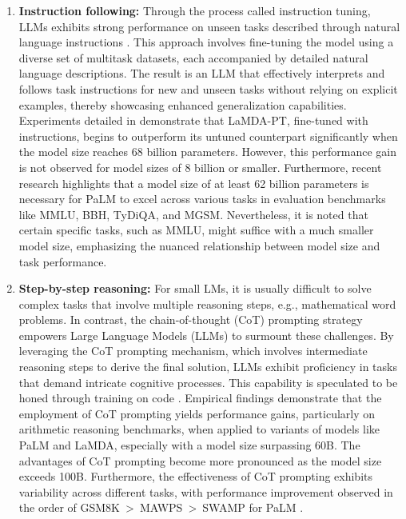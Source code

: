 \begin{enumerate}
{\begin{enumerate}
{\begin{quote}
                    \textit{Input:} {\enquote{What is the sum of 42 and 63?}} \\
                    \textit{Output:} {\enquote{The sum of 42 and 63 is 105.}}
                \end{quote}
            }
            \item \textbf{Instruction following:}{
                Through the process called instruction tuning, LLMs exhibits strong performance on unseen tasks described through natural language instructions \cite{instruction1, ouyang2022training, wei2022fine}.
                This approach involves fine-tuning the model using a diverse set of multitask datasets, each accompanied by detailed natural language descriptions. The result is an LLM that effectively interprets and follows task instructions for new and unseen tasks without relying on explicit examples, thereby showcasing enhanced generalization capabilities.
                Experiments detailed in \cite{wei2022fine} demonstrate that LaMDA-PT, fine-tuned with instructions, begins to outperform its untuned counterpart significantly when the model size reaches 68 billion parameters. However, this performance gain is not observed for model sizes of 8 billion or smaller. Furthermore, recent research \cite{chung2022scaling} highlights that a model size of at least 62 billion parameters is necessary for PaLM to excel across various tasks in evaluation benchmarks like MMLU, BBH, TyDiQA, and MGSM. Nevertheless, it is noted that certain specific tasks, such as MMLU, might suffice with a much smaller model size, emphasizing the nuanced relationship between model size and task performance.
            }
            \item \textbf{Step-by-step reasoning:} { For small LMs, it is usually difficult to solve complex tasks that involve multiple reasoning steps, e.g., mathematical word problems.
            In contrast, the chain-of-thought (CoT) prompting strategy \cite{wei2022chain} empowers Large Language Models (LLMs) to surmount these challenges. By leveraging the CoT prompting mechanism, which involves intermediate reasoning steps to derive the final solution, LLMs exhibit proficiency in tasks that demand intricate cognitive processes. This capability is speculated to be honed through training on code . Empirical findings  demonstrate that the employment of CoT prompting yields performance gains, particularly on arithmetic reasoning benchmarks, when applied to variants of models like PaLM and LaMDA, especially with a model size surpassing 60B. The advantages of CoT prompting become more pronounced as the model size exceeds 100B. Furthermore, the effectiveness of CoT prompting exhibits variability across different tasks, with performance improvement observed in the order of GSM8K~\textgreater~MAWPS~\textgreater~SWAMP for PaLM .
            }
        \end{enumerate}
    }
\end{enumerate}
